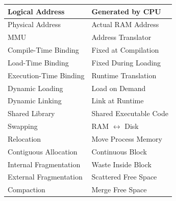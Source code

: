 \begin{center}
\begin{tabular}{|p{5cm}|p{8cm}|}
\hline
Logical Address & Generated by CPU \\
\hline
Physical Address & Actual RAM Address \\
\hline
MMU & Address Translator \\
\hline
Compile-Time Binding & Fixed at Compilation \\
\hline
Load-Time Binding & Fixed During Loading \\
\hline
Execution-Time Binding & Runtime Translation \\
\hline
Dynamic Loading & Load on Demand \\
\hline
Dynamic Linking & Link at Runtime \\
\hline
Shared Library & Shared Executable Code \\
\hline
Swapping & RAM $\leftrightarrow$ Disk \\
\hline
Relocation & Move Process Memory \\
\hline
Contiguous Allocation & Continuous Block \\
\hline
Internal Fragmentation & Waste Inside Block \\
\hline
External Fragmentation & Scattered Free Space \\
\hline
Compaction & Merge Free Space \\
\hline
\end{tabular}
\end{center}